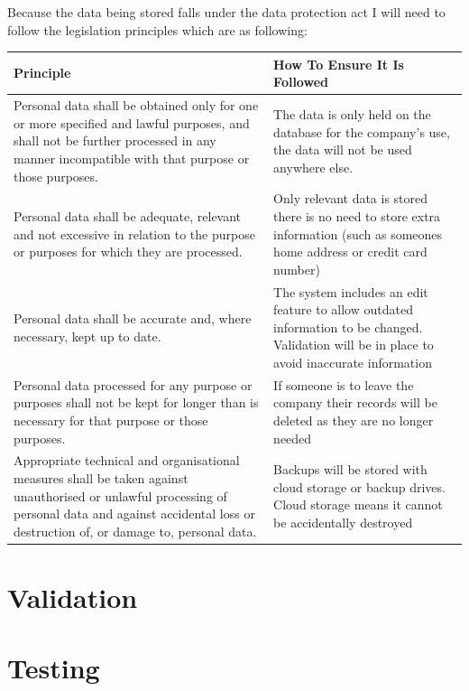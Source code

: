 Because the data being stored falls under the data protection act I will need to follow the legislation principles which are as following:


\begin{center}
    \begin{tabular}{|p{5cm}|p{6cm}|}
        \hline
        \textbf{Principle} & \textbf{How To Ensure It Is Followed}\\ \hline
Personal data shall be obtained only for one or more specified and lawful purposes, and shall not be further processed in any manner incompatible with that purpose or those purposes. & The data is only held on the database for the company's use, the data will not be used anywhere else. \\ \hline
Personal data shall be adequate, relevant and not excessive in relation to the purpose or purposes for which they are processed. & Only relevant data is stored there is no need to store extra information (such as someones home address or credit card number) \\ \hline
Personal data shall be accurate and, where necessary, kept up to date. & The system includes an edit feature to allow outdated information to be changed. Validation will be in place to avoid inaccurate information \\ \hline
Personal data processed for any purpose or purposes shall not be kept for longer than is necessary for that purpose or those purposes. & If someone is to leave the company their records will be deleted as they are no longer needed \\ \hline
Appropriate technical and organisational measures shall be taken against unauthorised or unlawful processing of personal data and against accidental loss or destruction of, or damage to, personal data. & Backups will be stored with cloud storage or backup drives. Cloud storage means it cannot be accidentally destroyed \\ \hline
    \end{tabular}
\end{center}

\section{Validation}

\section{Testing}

